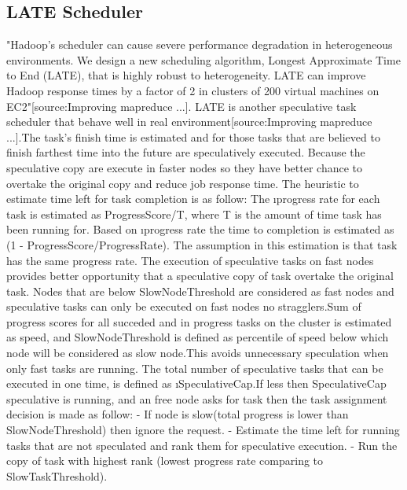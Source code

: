 
\subsection{LATE Scheduler}

"Hadoop’s scheduler can cause severe performance degradation in heterogeneous environments. We design a new scheduling algorithm, Longest Approximate Time to End (LATE), that is highly robust to heterogeneity. LATE can improve Hadoop response times by a factor of 2 in clusters of 200 virtual machines on EC2"[source:Improving mapreduce ...].
LATE is another speculative task scheduler that behave well in real environment[source:Improving mapreduce ...].The task's finish time is estimated and for those tasks that are believed to finish farthest time into the future are speculatively executed. Because the speculative copy are execute in faster nodes so they have better chance to overtake the original copy and reduce job response time. 
The heuristic to estimate time left for task completion is as follow: The \i{progress rate} for each task is estimated as  ProgressScore/T, where T is the amount of time task has been running for. Based on \i{progress rate} the time to completion is estimated as (1 - ProgressScore/ProgressRate). The assumption in this estimation is that task has the same progress rate.
The execution of speculative tasks on fast nodes provides better opportunity that a speculative copy of task overtake the original task. Nodes that are below SlowNodeThreshold are considered as fast nodes and speculative tasks can only be executed on fast nodes no stragglers.Sum of progress scores for all succeded and in progress tasks on the cluster is estimated as speed, and SlowNodeThreshold is defined as percentile of speed below which node will be considered as slow node.This avoids unnecessary speculation when only fast tasks are running.  
The total number of speculative tasks that can be executed in one time, is defined as \i{SpeculativeCap}.If less then SpeculativeCap speculative is running, and an free node asks for task then the task assignment decision is made as follow:
 - If node is slow(total progress is lower than SlowNodeThreshold) then ignore the request. 
 - Estimate the time left for running tasks that are not speculated and rank them for speculative execution. 
 - Run the copy of task with highest rank (lowest progress rate comparing to SlowTaskThreshold). 
 
